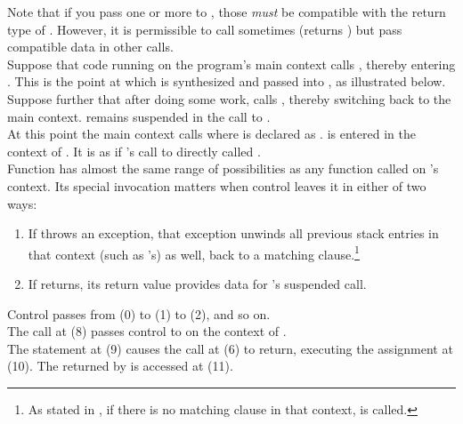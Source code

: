 Note that if you pass one or more  to \resumewith,
those  \emph{must} be compatible with the return type
of . However, it is permissible to call 
sometimes (\dataavail returns ) but pass compatible data in
other \resumewith calls.\\

Suppose that code running on the program's main context calls ,
thereby entering . This is the point at which  is synthesized
and passed into , as illustrated below.\\

Suppose further that after doing some work,  calls ,
thereby switching back to the main context.  remains suspended
in the call to .\\

At this point the main context calls 
where  is declared as .  is
entered in the context of . It is as if 's call
to  directly called .\\

Function  has almost the same range of possibilities as any function
called on 's context. Its special invocation matters when control
leaves it in either of two ways:

\begin{enumerate}
  \item If  throws an exception, that exception unwinds all previous
        stack entries in that context (such as 's) as well, back to a
        matching  clause.\footnote{As stated in ,
        if there is no matching  clause in that context,
         is called.}
  \item If  returns, its return value provides data for
        's suspended  call.
\end{enumerate}


Control passes from (0) to (1) to (2), and so on.\\

The  call at (8) passes control
to  on the context of .\\

The  statement at (9) causes the \resume call at (6) to return,
executing the assignment at (10). The  returned by  is
accessed at (11).\\

